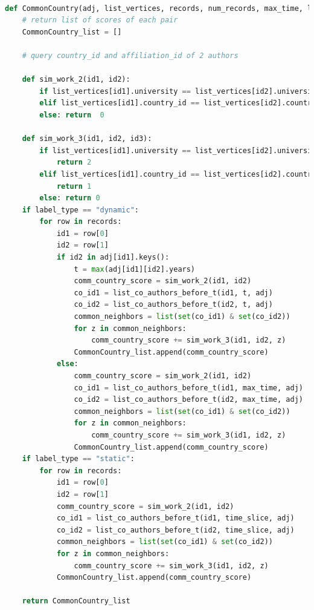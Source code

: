 \documentclass{article}
\begin{document}
\begin{lstlisting}[language=Python, caption=Độ đo Common Country]

def CommonCountry(adj, list_vertices, records, num_records, max_time, label_type, time_slice):  # records of potential_co_author
    # return list of scores of each pair
    CommonCountry_list = []
    
    # query country_id and affiliation_id of 2 authors
        
    def sim_work_2(id1, id2):
        if list_vertices[id1].university == list_vertices[id2].university: return 2
        elif list_vertices[id1].country_id == list_vertices[id2].country_id: return 1
        else: return  0

    def sim_work_3(id1, id2, id3):
        if list_vertices[id1].university == list_vertices[id2].university and list_vertices[id1].university == list_vertices[id3].university:
            return 2
        elif list_vertices[id1].country_id == list_vertices[id2].country_id and list_vertices[id1].country_id == list_vertices[id3].country_id:
            return 1
        else: return 0
    if label_type == "dynamic":
        for row in records:
            id1 = row[0]
            id2 = row[1]
            if id2 in adj[id1].keys(): 
                t = max(adj[id1][id2].years)
                comm_country_score = sim_work_2(id1, id2)    
                co_id1 = list_co_authors_before_t(id1, t, adj)
                co_id2 = list_co_authors_before_t(id2, t, adj)
                common_neighbors = list(set(co_id1) & set(co_id2))
                for z in common_neighbors:
                    comm_country_score += sim_work_3(id1, id2, z)
                CommonCountry_list.append(comm_country_score)
            else:
                comm_country_score = sim_work_2(id1, id2)    
                co_id1 = list_co_authors_before_t(id1, max_time, adj)
                co_id2 = list_co_authors_before_t(id2, max_time, adj)
                common_neighbors = list(set(co_id1) & set(co_id2))
                for z in common_neighbors:
                    comm_country_score += sim_work_3(id1, id2, z)
                CommonCountry_list.append(comm_country_score)
    if label_type == "static":
        for row in records:
            id1 = row[0]
            id2 = row[1]
            comm_country_score = sim_work_2(id1, id2)    
            co_id1 = list_co_authors_before_t(id1, time_slice, adj)
            co_id2 = list_co_authors_before_t(id2, time_slice, adj)
            common_neighbors = list(set(co_id1) & set(co_id2))
            for z in common_neighbors:
                comm_country_score += sim_work_3(id1, id2, z)
            CommonCountry_list.append(comm_country_score)
            
    return CommonCountry_list

\end{lstlisting}
\end{document}
